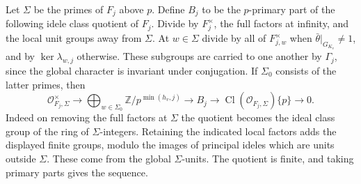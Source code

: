 \documentclass[a4paper,11pt]{article}
\theoremstyle{definition}
\theoremstyle{remark}
\newcommand{\ZZ}{\mathbb Z}\newcommand{\ord}{\operatorname{ord}}
\numberwithin{equation}{section}
\newcommand{\Cl}{\operatorname{Cl}}
\begin{document}
Let \(\Sigma\) be the primes of \(F_j\) above \(p\). Define
\(B_j\) to be the \(p\)-primary part of the following idele class
quotient of \(F_j\). Divide by \(F_j^\times\), the full factors at
infinity, and the local unit groups away from \(\Sigma\). At
\(w\in\Sigma\) divide by all of \(F_{j,w}^\times\) when
\(\bar\theta|_{G_{K_v}}\ne1\), and by \(\ker\lambda_{w,j}\)
otherwise. These subgroups are carried to one another by
\(\Gamma_j\), since the global character is invariant under
conjugation. If \(\Sigma_0\) consists of the latter primes, then
\begin{equation}
 \mathcal O_{F_j,\Sigma}^{\times}\longrightarrow
   \bigoplus_{w\in\Sigma_0}\ZZ/p^{\min(h_v,j)}
   \longrightarrow B_j\longrightarrow
   \Cl(\mathcal O_{F_j,\Sigma})\{p\}\longrightarrow0 .
 \label{eq:idele113}
\end{equation}
Indeed on removing the full factors at \(\Sigma\) the quotient
becomes the ideal class group of the ring of \(\Sigma\)-integers.
Retaining the indicated local factors adds the displayed finite
groups, modulo the images of principal ideles which are units
outside \(\Sigma\). These come from the global \(\Sigma\)-units.
The quotient is finite, and taking primary parts gives the sequence.
\end{document}

